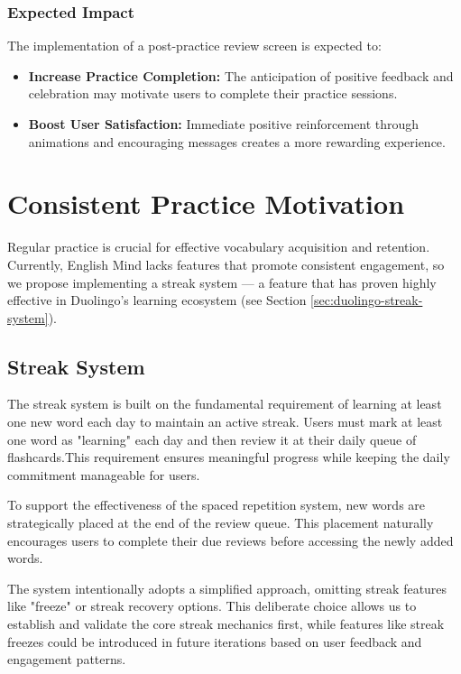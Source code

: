 \subsubsection{Expected Impact}

The implementation of a post-practice review screen is expected to:

\begin{itemize}
    \item \textbf{Increase Practice Completion:} The anticipation of positive feedback and celebration may motivate users to complete their practice sessions.
    
    \item \textbf{Boost User Satisfaction:} Immediate positive reinforcement through animations and encouraging messages creates a more rewarding experience.
\end{itemize}

\newpage

\section{Consistent Practice Motivation}
\label{sec:em-gamification-practice-motivation}

Regular practice is crucial for effective vocabulary acquisition and retention. Currently, English Mind lacks features that promote consistent engagement, so we propose implementing a streak system — a feature that has proven highly effective in Duolingo's learning ecosystem (see Section \ref{sec:duolingo-streak-system}).

\subsection{Streak System}

The streak system is built on the fundamental requirement of learning at least one new word each day to maintain an active streak. Users must mark at least one word as "learning" each day and then review it at their daily queue of flashcards.This requirement ensures meaningful progress while keeping the daily commitment manageable for users. 

To support the effectiveness of the spaced repetition system, new words are strategically placed at the end of the review queue. This placement naturally encourages users to complete their due reviews before accessing the newly added words.

The system intentionally adopts a simplified approach, omitting streak features like "freeze" or streak recovery options. This deliberate choice allows us to establish and validate the core streak mechanics first, while features like streak freezes could be introduced in future iterations based on user feedback and engagement patterns.

